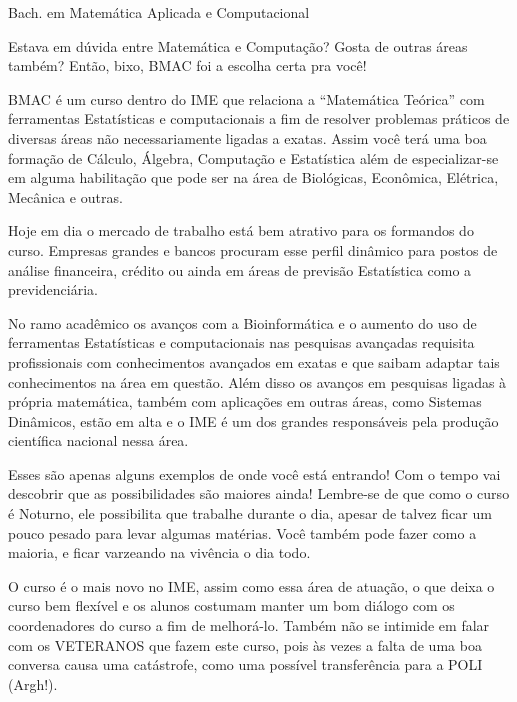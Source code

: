 \begin{subsecao}{Bach. em Matemática Aplicada e Computacional}

Estava em dúvida entre Matemática e Computação? Gosta de outras áreas também?
Então, bixo, BMAC foi a escolha certa pra você!

BMAC é um curso dentro do IME que relaciona a ``Matemática Teórica'' com
ferramentas Estatísticas e computacionais a fim de resolver problemas práticos
de diversas áreas não necessariamente ligadas a exatas. Assim você terá uma boa
formação de Cálculo, Álgebra, Computação e Estatística além de especializar-se
em alguma habilitação que pode ser na área de Biológicas, Econômica, Elétrica,
Mecânica e outras.

Hoje em dia o mercado de trabalho está bem atrativo para os formandos do curso.
Empresas grandes e bancos procuram esse perfil dinâmico para postos de análise
financeira, crédito ou ainda em áreas de previsão Estatística como a
previdenciária.

No ramo acadêmico os avanços com a Bioinformática e o aumento do uso de
ferramentas Estatísticas e computacionais nas pesquisas avançadas requisita
profissionais com conhecimentos avançados em exatas e que saibam adaptar tais
conhecimentos na área em questão. Além disso os avanços em pesquisas ligadas à
própria matemática, também com aplicações em outras áreas, como Sistemas
Dinâmicos, estão em alta e o IME é um dos grandes responsáveis pela produção
científica nacional nessa área.

Esses são apenas alguns exemplos de onde você está entrando! Com o tempo vai
descobrir que as possibilidades são maiores ainda! Lembre-se de que como o
curso é Noturno, ele possibilita que trabalhe durante o dia, apesar de talvez
ficar um pouco pesado para levar algumas matérias. Você também pode fazer como
a maioria, e ficar varzeando na vivência o dia todo.

O curso é o mais novo no IME, assim como essa área de atuação, o que deixa o
curso bem flexível e os alunos costumam manter um bom diálogo com os
coordenadores do curso a fim de melhorá-lo. Também não se intimide em falar com
os VETERANOS que fazem este curso, pois às vezes a falta de uma boa conversa
causa uma catástrofe, como uma possível transferência para a POLI (Argh!).

\end{subsecao}
